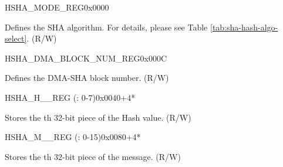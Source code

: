 \begin{register}{H}{SHA\_MODE\_REG}{0x0000}\label{regdesc:SHAMODEREG}
%
%
\regnewline%
\begin{regdesc}\begin{reglist}
\label{fielddesc:SHAMODE}\item [SHA\_MODE] Defines the SHA algorithm. For details, please see Table \ref{tab:sha-hash-algo-select}. (R/W)
\end{reglist}\end{regdesc}
\end{register}



\begin{register}{H}{SHA\_DMA\_BLOCK\_NUM\_REG}{0x000C}\label{regdesc:SHADMABLOCKNUMREG}
%
%
\regnewline%
\begin{regdesc}\begin{reglist}
\label{fielddesc:SHADMABLOCKNUM}\item [SHA\_DMA\_BLOCK\_NUM] Defines the DMA-SHA block number. (R/W)
\end{reglist}\end{regdesc}
\end{register}

\begin{register}{H}{SHA\_H\_\_REG (: 0-7)}{0x0040+4*}\label{regdesc:SHAHNREG}
%
\regnewline%
\begin{regdesc}\begin{reglist}
\label{fielddesc:SHAH0}\item [SHA\_H\_\regindex{n}] Stores the th 32-bit piece of the Hash value. (R/W)
\end{reglist}\end{regdesc}
\end{register}

\begin{register}{H}{SHA\_M\_\_REG (: 0-15)}{0x0080+4*}\label{regdesc:SHAMNREG}
%
\regnewline%
\begin{regdesc}\begin{reglist}
\label{fielddesc:SHAM0}\item [SHA\_M\_\regindex{n}] Stores the th 32-bit piece of the message. (R/W)
\end{reglist}\end{regdesc}
\end{register}
